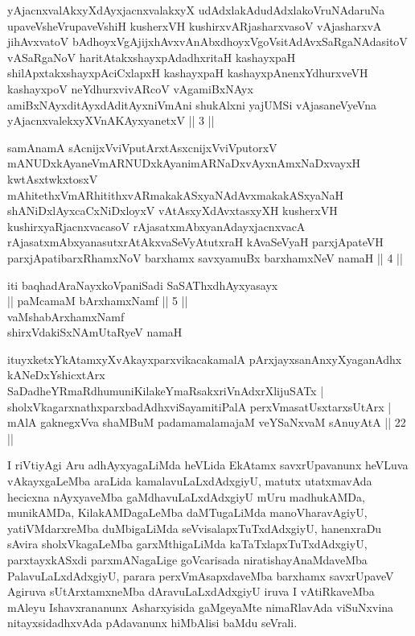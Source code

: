 \begin{shl}
yAjacnxvalAkxyXdAyxjacnxvalakxyX udAdxlakAdudAdxlakoV\s ruNAdaruNa upaveVsheVrupaveVshiH kusherxVH kushirxvARjasharxvasoV vAjasharxvA jihAvxvatoV bAdhoyxVgAjijxhAvxvAnAbxdhoyxVgoV\s sitAdAvxSaRgaNAdasitoV vASaRgaNoV haritAtakxshayxpAdadhxritaH kashayxpaH shilApxtakxshayxpAciCxlapxH kashayxpaH kashayxpAnenxYdhurxveVH kashayxpoV neYdhurxvivARcoV vAgamiBxNAyx amiBxNAyxditAyxdAditAyxniVmAni shukAlxni yajUMSi vAjasaneVyeVna yAjacnxvalekxyXVnAKAyxyanetxV || 3 ||
\end{shl}

\begin{shl}
samAnamA sAcnijxVviVputArxtAsxcnijxVviVputorxV mANUDxkAyaneVmARNUDxkAyanimARNaDxvAyxnAmxNaDxvayxH kwtAsxtwkxtosxV mAhitethxVmARhitithxvARmakakASxyaNAdAvxmakakASxyaNaH shANiDxlAyxcaCxNiDxloyxV vAtAsxyXdAvxtasxyXH kusherxVH kushirxyaRjacnxvacasoV rAjasatxmAbxyanAdayxjacnxvacA rAjasatxmAbxyanasutxrAtAkxvaSeVyAtutxraH kAvaSeVyaH parxjApateVH parxjApatibarxRhamxNoV barxhamx savxyamuBx barxhamxNeV namaH || 4 ||
\end{shl}

\begin{center}
iti baqhadAraNayxkoVpaniSadi SaSAThxdhAyxyasayx\\
|| paMcamaM bArxhamxNamf || 5 ||\\
vaMshabArxhamxNamf\\
shirxVdakiSxNAmUtaRyeV namaH
\end{center}

\begin{shl}
ituyxketxYkAtamxyXvAkayxparxvikacakamalA pArxjayxsanAnxyXyaganAdhx \\
kANeDxYshicxtArx SaDadheYRmaRdhumuniKilakeYmaRsakxriVnAdxrXlijuSATx | \\
sholxVkagarxnathxparxbadAdhx\s viSayamitiPalA perxVmasatUsxtarxsUtArx | \\
mAlA gaknegxVva shaMBuM padamamalamajaM veYSaNxvaM sA\s nuyAtA \hfill||  22 ||  
\end{shl}

\begin{artha}
I riVtiyAgi Aru adhAyxyagaLiMda heVLida EkAtamx savxrUpavanunx heVLuva 
vAkayxgaLeMba araLida kamalavuLaLxdAdxgiyU, matutx utatxmavAda 
hecicxna nAyxya\-veMba gaMdhavuLaLxdAdxgiyU mUru madhukAMDa, munikAMDa, 
KilakAMDagaLeMba daMTugaLiMda manoVharavAgiyU, yatiVMdarxreMba 
duMbigaLiMda seVvisalapxTuTx\-dAdxgiyU, hanenxraDu sAvira 
sholxVkagaLeMba garxMthigaLiMda kaTaTxlapxTuTxdAdxgiyU, \-parxtayxkASxdi 
parxmANagaLige goVcarisada niratishayAnaMdaveMba PalavuLaLxdAdxgiyU, 
parara perxVmAsapxdaveMba barxhamx savxrUpaveV Agiruva sUtArxtamxneMba 
dAravuLaLxdAdxgi\-yU iruva I vAtiRkaveMba mAleyu Ishavxrananunx 
Asharxyisida gaMgeyaMte nimaRlavAda viSuNxvina nitayxsidadhxvAda 
pAdavanunx hiMbAlisi baMdu seVrali.
\end{artha}

